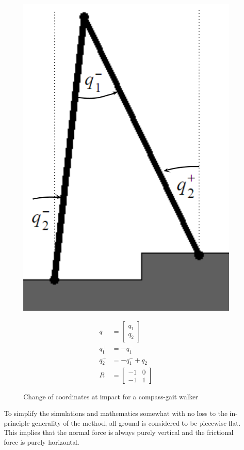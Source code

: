 \begin{figure}[htp]
\centering
\begin{minipage}{0.45\linewidth}
\centering
	\includegraphics[width=0.5\linewidth]{3TechBackground/impact.png}
	\caption{Change of coordinates at impact for a compass-gait walker}
	\label{fig:relabelimpact}
\end{minipage}
\hspace{0.5cm}
\begin{minipage}{0.45\linewidth}
\begin{align*}
	q &= \begin{bmatrix}
		q_1 \\ q_2
	\end{bmatrix} \\
	q_1^+ &= -q_1^- \\
	q_2^+ &= -q_1^- + q_2 \\
	R &= \begin{bmatrix}
		-1	& 	0	\\
		-1	&	1
	\end{bmatrix}
\end{align*}
\end{minipage}
\end{figure}

To simplify the simulations and mathematics somewhat with no loss to the in-principle generality of the method, all ground is considered to be piecewise flat. This implies that the normal force is always purely vertical and the frictional force is purely horizontal.

